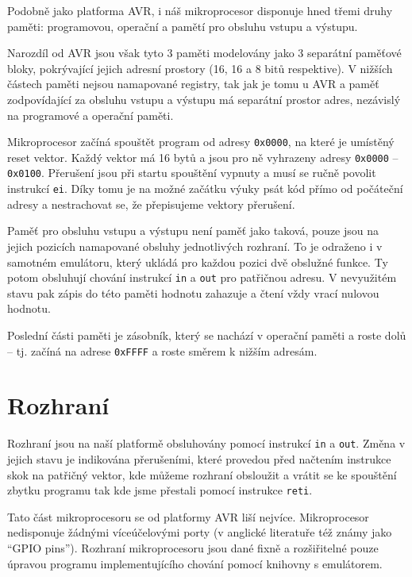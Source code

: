 Podobně jako platforma AVR\cite{attiny12-datasheet}, i náš mikroprocesor disponuje hned třemi druhy paměti: programovou, operační a pamětí pro obsluhu vstupu a výstupu.

Narozdíl od AVR jsou však tyto 3 paměti modelovány jako 3 separátní paměťové bloky, pokrývající jejich adresní prostory (16, 16 a 8 bitů respektive). V nižších částech paměti nejsou namapované registry, tak jak je tomu u AVR\cite{attiny12-datasheet} a paměť zodpovídající za obsluhu vstupu a výstupu má separátní prostor adres, nezávislý na programové a operační paměti.

Mikroprocesor začíná spouštět program od adresy \texttt{0x0000}, na které je umístěný reset vektor. Každý vektor má 16 bytů a jsou pro ně vyhrazeny adresy \texttt{0x0000} -- \texttt{0x0100}. Přerušení jsou při startu spouštění vypnuty a musí se ručně povolit instrukcí \texttt{ei}. Díky tomu je na možné začátku výuky psát kód přímo od počáteční adresy a nestrachovat se, že přepisujeme vektory přerušení.

Paměť pro obsluhu vstupu a výstupu není paměť jako taková, pouze jsou na jejich pozicích namapované obsluhy jednotlivých rozhraní. To je odraženo i v samotném emulátoru, který ukládá pro každou pozici dvě obslužné funkce. Ty potom obsluhují chování instrukcí \texttt{in} a \texttt{out} pro patřičnou adresu. V nevyužitém stavu pak zápis do této paměti hodnotu zahazuje a čtení vždy vrací nulovou hodnotu.

Poslední části paměti je zásobník, který se nachází v operační paměti a roste dolů -- tj. začíná na adrese \texttt{0xFFFF} a roste směrem k nižším adresám.

\section{Rozhraní}

Rozhraní jsou na naší platformě obsluhovány pomocí instrukcí \texttt{in} a \texttt{out}. Změna v jejich stavu je indikována přerušeními, které provedou před načtením instrukce skok na patřičný vektor, kde můžeme rozhraní obsloužit a vrátit se ke spouštění zbytku programu tak kde jsme přestali pomocí instrukce \texttt{reti}.

Tato část mikroprocesoru se od platformy AVR liší nejvíce. Mikroprocesor nedisponuje žádnými víceúčelovými porty (v anglické literatuře též známy jako ``GPIO pins''). Rozhraní mikroprocesoru jsou dané fixně a rozšiřitelné pouze úpravou programu implementujícího chování pomocí knihovny s emulátorem.

